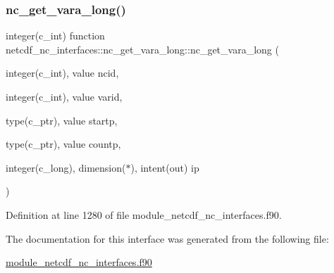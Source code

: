 \subsubsection{\texorpdfstring{nc\+\_\+get\+\_\+vara\+\_\+long()}{nc\_get\_vara\_long()}}
{\footnotesize\ttfamily integer(c\+\_\+int) function netcdf\+\_\+nc\+\_\+interfaces\+::nc\+\_\+get\+\_\+vara\+\_\+long\+::nc\+\_\+get\+\_\+vara\+\_\+long (\begin{DoxyParamCaption}\item[{integer(c\+\_\+int), value}]{ncid,  }\item[{integer(c\+\_\+int), value}]{varid,  }\item[{type(c\+\_\+ptr), value}]{startp,  }\item[{type(c\+\_\+ptr), value}]{countp,  }\item[{integer(c\+\_\+long), dimension($\ast$), intent(out)}]{ip }\end{DoxyParamCaption})}



Definition at line 1280 of file module\+\_\+netcdf\+\_\+nc\+\_\+interfaces.\+f90.



The documentation for this interface was generated from the following file\+:\begin{DoxyCompactItemize}
\item 
\hyperlink{module__netcdf__nc__interfaces_8f90}{module\+\_\+netcdf\+\_\+nc\+\_\+interfaces.\+f90}\end{DoxyCompactItemize}

